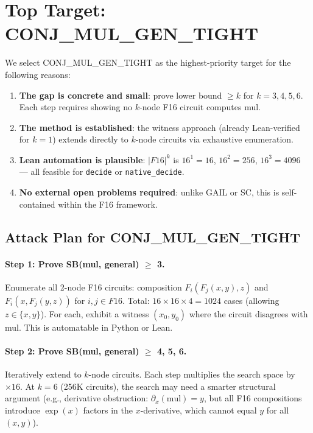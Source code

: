 \documentclass[11pt]{article}
\begin{document}
\section{Top Target: CONJ\_MUL\_GEN\_TIGHT}

We select CONJ\_MUL\_GEN\_TIGHT as the highest-priority target for the following reasons:

\begin{enumerate}
\item \textbf{The gap is concrete and small}: prove lower bound $\geq k$ for
  $k = 3, 4, 5, 6$. Each step requires showing no $k$-node F16 circuit computes mul.
\item \textbf{The method is established}: the witness approach (already Lean-verified
  for $k=1$) extends directly to $k$-node circuits via exhaustive enumeration.
\item \textbf{Lean automation is plausible}: $|F16|^k$ is $16^1 = 16$, $16^2 = 256$,
  $16^3 = 4096$ — all feasible for \texttt{decide} or \texttt{native\_decide}.
\item \textbf{No external open problems required}: unlike GAIL or SC, this is
  self-contained within the F16 framework.
\end{enumerate}

\subsection{Attack Plan for CONJ\_MUL\_GEN\_TIGHT}

\paragraph{Step 1: Prove SB(mul, general) $\geq$ 3.}
Enumerate all 2-node F16 circuits: composition $F_i(F_j(x, y), z)$ and
$F_i(x, F_j(y, z))$ for $i, j \in F16$. Total: $16 \times 16 \times 4 = 1024$ cases
(allowing $z \in \{x, y\}$). For each, exhibit a witness $(x_0, y_0)$ where
the circuit disagrees with mul. This is automatable in Python or Lean.

\paragraph{Step 2: Prove SB(mul, general) $\geq$ 4, 5, 6.}
Iteratively extend to $k$-node circuits. Each step multiplies the search space by $\times 16$.
At $k = 6$ (256K circuits), the search may need a smarter structural argument (e.g.,
derivative obstruction: $\partial_x(\text{mul}) = y$, but all F16 compositions introduce
$\exp(x)$ factors in the $x$-derivative, which cannot equal $y$ for all $(x, y)$).
\end{document}
